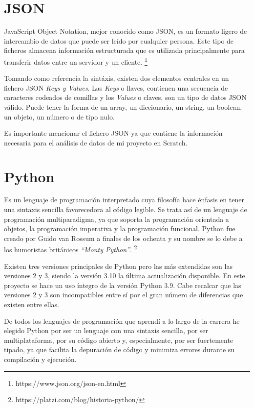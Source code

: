 \documentclass[a4paper, 12pt]{book}
\begin{document}
\section{JSON}
\label{sec:Json}

JavaScript Object Notation, mejor conocido como JSON, es un formato ligero de intercambio de datos que puede ser leído por cualquier persona. Este tipo de ficheros almacena información estructurada que es utilizada principalmente para transferir datos entre un servidor y un cliente. \footnote{https://www.json.org/json-en.html}

Tomando como referencia la sintáxis, existen dos elementos centrales en un fichero JSON \textit{Keys y Values}. Las \textit{Keys} o llaves, contienen una secuencia de caracteres rodeados de comillas y los \textit{Values} o claves, son un tipo de datos JSON válido. Puede tener la forma de un array, un diccionario, un string, un boolean, un objeto, un número o de tipo nulo. 

Es importante mencionar el fichero JSON ya que contiene la información necesaria para el análisis de datos de mi proyecto en Scratch.

\section{Python}
\label{sec:Python}

Es un lenguaje de programación interpretado cuya filosofía hace énfasis en tener una sintaxis sencilla favorecedora al código legible. Se trata así de un lenguaje de programación multiparadigma, ya que soporta la programación orientada a objetos, la programación imperativa y la programación funcional. Python fue creado por Guido van Rossum a finales de los ochenta y su nombre se lo debe a los humoristas británicos \textit{“Monty Python”}. \footnote{https://platzi.com/blog/historia-python/}

Existen tres versiones principales de Python pero las más extendidas son las versiones 2 y 3, siendo la versión 3.10 la última actualización disponible. En este proyecto se hace un uso íntegro de la versión Python 3.9. Cabe recalcar que las versiones 2 y 3 son incompatibles entre sí por el gran número de diferencias que existen entre ellas.

De todos los lenguajes de programación que aprendí a lo largo de la carrera he elegido Python por ser un lenguaje con una sintaxis sencilla, por ser multiplataforma, por su código abierto y, especialmente, por ser fuertemente tipado, ya que facilita la depuración de código y minimiza errores durante su compilación y ejecución.
\end{document}

